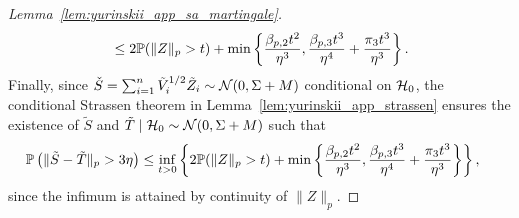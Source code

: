 \begin{proof}[Lemma~\ref{lem:yurinskii_app_sa_martingale}]
\begin{align*}
    &\quad\leq
    2 \P(\|Z\|_p > t)
    + \min \left\{
      \frac{\beta_{p,2} t^2}{\eta^3},
      \frac{\beta_{p,3} t^3}{\eta^4}
      + \frac{\pi_3 t^3}{\eta^3}
    \right\}.
  \end{align*}
  Finally, since
  $\check S = \sum_{i=1}^n \tilde V_i^{1/2} \tilde Z_i
  \sim \cN(0,\Sigma + M)$ conditional on $\cH_0$,
  the conditional Strassen theorem
  in Lemma~\ref{lem:yurinskii_app_strassen}
  ensures the existence of $\tilde S$ and
  $\tilde T \mid \cH_0 \sim \cN(0, \Sigma + M)$
  such that
  \begin{align}
    \label{eq:yurinskii_app_approx_modified_martingale}
    \P\left(\|\tilde S-\tilde T\|_p>3\eta\right)
    &\leq
    \inf_{t>0}
    \left\{
      2 \P(\|Z\|_p > t)
      + \min \left\{
        \frac{\beta_{p,2} t^2}{\eta^3},
        \frac{\beta_{p,3} t^3}{\eta^4} + \frac{\pi_3 t^3}{\eta^3}
      \right\}
    \right\},
  \end{align}
  since the infimum is attained by continuity of $\|Z\|_p$.



\end{proof}
